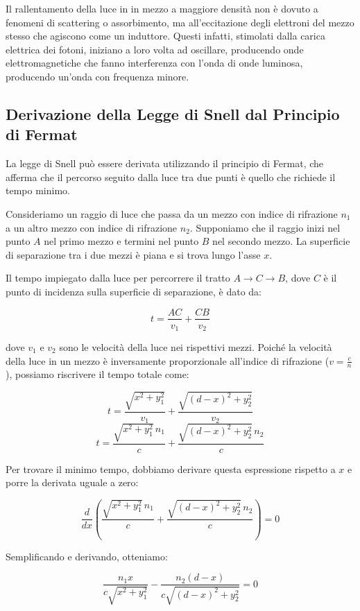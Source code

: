 \documentclass[12pt,a4paper]{report}
\begin{document}
Il rallentamento della luce in in mezzo a maggiore densità non è dovuto a fenomeni di scattering o assorbimento, ma all'eccitazione degli elettroni del mezzo stesso che agiscono come un induttore. Questi infatti, stimolati dalla carica elettrica dei fotoni, iniziano a loro volta ad oscillare, producendo onde elettromagnetiche che fanno interferenza con l'onda di onde luminosa, producendo un'onda con frequenza minore\cite{Fermilab2019}.

\subsection{Derivazione della Legge di Snell dal Principio di Fermat}

La legge di Snell può essere derivata utilizzando il principio di Fermat, che afferma che il percorso seguito dalla luce tra due punti è quello che richiede il tempo minimo.

Consideriamo un raggio di luce che passa da un mezzo con indice di rifrazione \( n_1 \) a un altro mezzo con indice di rifrazione \( n_2 \). Supponiamo che il raggio inizi nel punto \( A \) nel primo mezzo e termini nel punto \( B \) nel secondo mezzo. La superficie di separazione tra i due mezzi è piana e si trova lungo l'asse \( x \).

Il tempo impiegato dalla luce per percorrere il tratto \( A \to C \to B \), dove \( C \) è il punto di incidenza sulla superficie di separazione, è dato da:

\[ t = \frac{AC}{v_1} + \frac{CB}{v_2} \]

dove \( v_1 \) e \( v_2 \) sono le velocità della luce nei rispettivi mezzi. Poiché la velocità della luce in un mezzo è inversamente proporzionale all'indice di rifrazione (\( v = \frac{c}{n} \)), possiamo riscrivere il tempo totale come:

\[ t = \frac{\sqrt{x^2 + y_1^2}}{v_1} + \frac{\sqrt{(d - x)^2 + y_2^2}}{v_2} \]
\[ t = \frac{\sqrt{x^2 + y_1^2} \, n_1}{c} + \frac{\sqrt{(d - x)^2 + y_2^2} \, n_2}{c} \]

Per trovare il minimo tempo, dobbiamo derivare questa espressione rispetto a \( x \) e porre la derivata uguale a zero:

\[ \frac{d}{dx} \left( \frac{\sqrt{x^2 + y_1^2} \, n_1}{c} + \frac{\sqrt{(d - x)^2 + y_2^2} \, n_2}{c} \right) = 0 \]

Semplificando e derivando, otteniamo:

\[ \frac{n_1 x}{c \sqrt{x^2 + y_1^2}} - \frac{n_2 (d - x)}{c \sqrt{(d - x)^2 + y_2^2}} = 0 \]
\end{document}
